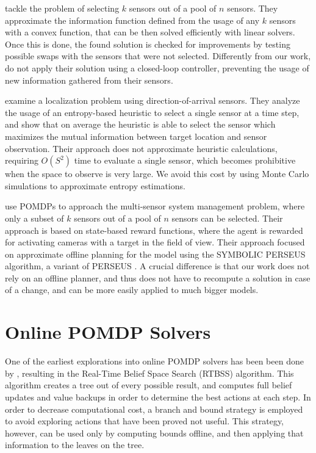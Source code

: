 \citet{cit:relworkconvex} tackle the problem of selecting $k$ sensors out of a pool of $n$ sensors.
They approximate the information function defined from the usage of any $k$ sensors with a convex
function, that can be then solved efficiently with linear solvers. Once this is done, the found
solution is checked for improvements by testing possible swaps with the sensors that were not selected.
Differently from our work, \citet{cit:relworkconvex} do not apply their solution using a closed-loop
controller, preventing the usage of new information gathered from their sensors.

\citet{cit:relworkentropy} examine a localization problem using direction-of-arrival sensors. They
analyze the usage of an entropy-based heuristic to select a single sensor at a time step, and show
that on average the heuristic is able to select the sensor which maximizes the mutual information
between target location and sensor observation. Their approach does not approximate heuristic
calculations, requiring $O(S^2)$ time to evaluate a single sensor, which becomes prohibitive when
the space to observe is very large. We avoid this cost by using Monte Carlo simulations to
approximate entropy estimations.

\citet{cit:relworkspaan} use POMDPs to approach the multi-sensor system management problem, where
only a subset of $k$ sensors out of a pool of $n$ sensors can be selected. Their approach is based
on state-based reward functions, where the agent is rewarded for activating cameras with a target in
the field of view. Their approach focused on approximate offline planning for the model using
the SYMBOLIC PERSEUS algorithm, a variant of PERSEUS \cite{cit:perseus}. A crucial difference
is that our work does not rely on an offline planner, and thus does not have to recompute a solution
in case of a change, and can be more easily applied to much bigger models.

\section{Online POMDP Solvers}

One of the earliest explorations into online POMDP solvers has been been done by
\citet{cit:rtbss}, resulting in the Real-Time Belief Space Search (RTBSS) algorithm. This
algorithm creates a tree out of every possible result, and computes full belief updates and value
backups in order to determine the best actions at each step. In order to decrease computational
cost, a branch and bound strategy is employed to avoid exploring actions that have been proved not
useful. This strategy, however, can be used only by computing bounds offline, and then applying that
information to the leaves on the tree.

